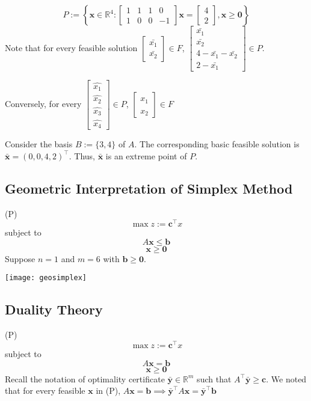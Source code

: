 \[ P:=\left\{\bm{x}\in\mathbb{R}^4:
\begin{bmatrix}
    1&1&1&0\\
    1&0&0&-1
\end{bmatrix}\bm{x}=
\begin{bmatrix}
    4\\
    2
\end{bmatrix}, \bm{x}\ge \bm{0}\right\} \]
Note that for every feasible solution
$ \begin{bmatrix}
    \bar{x_1}\\
    \bar{x_2}
\end{bmatrix}\in F $,
$ \begin{bmatrix}
    \bar{x_1}\\
    \bar{x_2}\\
    4-\bar{x_1}-\bar{x_2}\\
    2-\bar{x_1}
\end{bmatrix}\in P $.

Conversely, for every 
$ \begin{bmatrix}
    \hat{x_1}\\
    \hat{x_2}\\
    \hat{x_3}\\
    \hat{x_4}
\end{bmatrix}\in P $,
$ \begin{bmatrix}
    \hat{x_1}\\
    \hat{x_2}
\end{bmatrix}\in F $

Consider the basis $ B:=\{3,4\} $ of $ A $. The corresponding basic feasible
solution is $ \bm{\bar{x}}=(0,0,4,2)^\top $. Thus, $ \bm{\bar{x}} $ is
an extreme point of $ P $.

\subsection{Geometric Interpretation of Simplex Method}
(P)
\[ \max z:=\bm{c}^\top x \]
subject to
\[ A \bm{x}\le \bm{b} \]
\[ \bm{x}\ge \bm{0} \]
Suppose $ n=1 $ and $ m=6 $ with $ \bm{b}\ge \bm{0} $.

\begin{center}
    \texttt{[image: geosimplex]}
\end{center}

\subsection{Duality Theory}
(P)
\[ \max z:=\bm{c}^\top x \]
subject to
\[ A \bm{x}= \bm{b} \]
\[ \bm{x}\ge \bm{0} \]
Recall the notation of optimality certificate $ \bm{\bar{y}}\in\mathbb{R}^m $ such that $ A ^\top \bm{\bar{y}}\ge \bm{c} $. We noted that for
every feasible $ \bm{x} $ in (P), $ A \bm{x}= \bm{b}\implies
\bm{\bar{y}}^\top A \bm{x}=\bm{\bar{y}}^\top \bm{b} $

